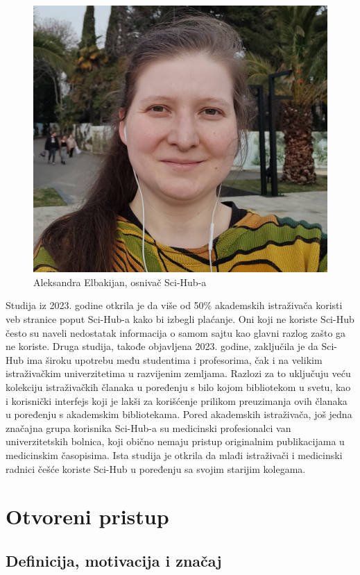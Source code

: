 \documentclass{article}
\begin{document}
\begin{figure} [h]
    \centering
    \includegraphics[width=0.5\linewidth]{img/Alexandra_Elbakyan.jpg}
    \caption{Aleksandra Elbakijan, osnivač Sci-Hub-a}
\end{figure}

Studija iz 2023. godine otkrila je da više od 50\% akademskih istraživača koristi veb stranice poput Sci-Hub-a kako bi izbegli plaćanje\cite{fastcompany}. Oni koji ne koriste Sci-Hub često su naveli nedostatak informacija o samom sajtu kao glavni razlog zašto ga ne koriste. Druga studija, takođe objavljena 2023. godine, zaključila je da Sci-Hub ima široku upotrebu među studentima i profesorima, čak i na velikim istraživačkim univerzitetima u razvijenim zemljama. Razlozi za to uključuju veću kolekciju istraživačkih članaka u poređenju s bilo kojom bibliotekom u svetu, kao i korisnički interfejs koji je lakši za korišćenje prilikom preuzimanja ovih članaka u poređenju s akademskim bibliotekama. Pored akademskih istraživača, još jedna značajna grupa korisnika Sci-Hub-a su medicinski profesionalci van univerzitetskih bolnica, koji obično nemaju pristup originalnim publikacijama u medicinskim časopisima. Ista studija je otkrila da mlađi istraživači i medicinski radnici češće koriste Sci-Hub u poređenju sa svojim starijim kolegama\cite{pastor2023scihub}.


\section{Otvoreni pristup}

\subsection{Definicija, motivacija i značaj}
\end{document}

